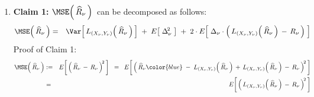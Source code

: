 \begin{enumerate}
\begin{eqnarray*}
{                }{
                (X_{\nu}\slash N_{\nu})^{2}\,
                \left(\left.\widehat{X}^{\textnormal{(HT)}}_{\nu}\right\slash N_{\nu}\right)
                }
            \,\right)
    \\
    & = &
        \left(\;
            O(1) \cdot O_{p}\!\left(\dfrac{1}{\sqrt{n_{\nu}}}\right)
            \; + \;
            O(1) \cdot O_{p}\!\left(\dfrac{1}{\sqrt{n_{\nu}}}\right)
            \;\right)
        \cdot
        O_{p}\!\left(\dfrac{1}{\sqrt{n_{\nu}}}\right)
        \cdot
        O_{p}(1)\,,
        \;\;
        \textnormal{by Claim 1, Claim 2, and Theorem \ref{AsymptoticsHTForDomainTotal}}
    \\
    & = &
        O_{p}\!\left(\dfrac{1}{\sqrt{n_{\nu}}}\right)
        \cdot
        O_{p}\!\left(\dfrac{1}{\sqrt{n_{\nu}}}\right)
    \;\; = \;\;
        O_{p}\!\left(\dfrac{1}{n_{\nu}}\right),
    \end{eqnarray*}
    as required.
\item
    \textbf{Claim 1:}\quad
    $\MSE\!\left(\,\widehat{R}_{\nu}\,\right)$\,
    can be decomposed as follows:
    \begin{eqnarray*}
    \MSE\!\left(\,\widehat{R}_{\nu}\,\right)
    & = &
        \Var\!\left[\,
            L_{(X_{\nu},Y_{\nu})}\!\left(\,\widehat{R}_{\nu}\,\right)
            \,\right]
        \; + \;
        E\!\left[\;\Delta_{\nu}^{\!2}\;\right]
        \; + \;
        2 \cdot
        E\!\left[\;
            \Delta_{\nu}
            \cdot
            \left(\,
                L_{(X_{\nu},Y_{\nu})}\!\left(\,\widehat{R}_{\nu}\,\right)
                \,-\,
                R_{\nu}
                \,\right)
            \;\right]
    \end{eqnarray*}
    \vskip 0.1cm
    \noindent
    Proof of Claim 1:
    \begin{eqnarray*}
    \MSE\!\left(\,\widehat{R}_{\nu}\,\right)
    & := &
        E\!\left[\,\left(\,\widehat{R}_{\nu}\,-\,R_{\nu}\,\right)^{\!2}\,\right]
    \;\; = \;\;
        E\!\left[\,\left(\,
            \widehat{R}_{\nu}
            {\color{blue}
            \;-\;
            L_{(X_{\nu},Y_{\nu})}\!\left(\,\widehat{R}_{\nu}\,\right)
            \,+\,
            L_{(X_{\nu},Y_{\nu})}\!\left(\,\widehat{R}_{\nu}\,\right)
            }
            \,-\,
            R_{\nu}
            \,\right)^{\!2}\,\right]
    \\
    & = &
        E\!\left[\,\left(\,
            L_{(X_{\nu},Y_{\nu})}\!\left(\,\widehat{R}_{\nu}\,\right)
            \,-\,
            R_{\nu}
            \,\right)^{\!2}\,\right]

\end{eqnarray*}
\end{enumerate}
